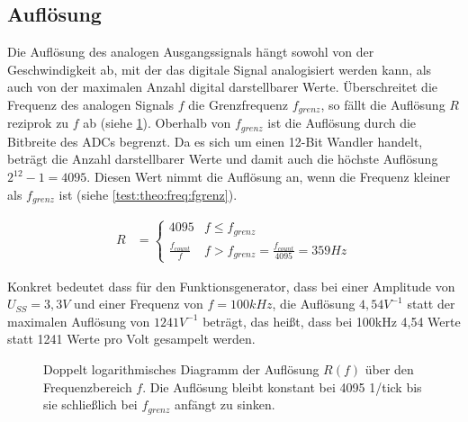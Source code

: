 \subsection{Auflösung}
Die Auflösung des analogen Ausgangssignals hängt sowohl von der Geschwindigkeit ab, mit der das digitale Signal analogisiert werden kann, als auch von der maximalen Anzahl digital darstellbarer Werte.
Überschreitet die Frequenz des analogen Signals $f$ die Grenzfrequenz $f_{grenz}$, so fällt die Auflösung $R$ reziprok zu $f$ ab (siehe \cref{test:theo:res:plot}).
Oberhalb von $f_{grenz}$ ist die Auflösung durch die Bitbreite des ADCs begrenzt.
Da es sich um einen 12-Bit Wandler handelt, beträgt die Anzahl darstellbarer Werte und damit auch die höchste Auflösung $2^{12} - 1 = 4095$.
Diesen Wert nimmt die Auflösung an, wenn die Frequenz kleiner als $f_{grenz}$ ist (siehe \cref{test:theo:freq:fgrenz}).

\begin{align}
  R &= \begin{cases}
    4095               & f \leq f_{grenz}                      \\
    \frac{f_{count}}{f} & f > f_{grenz} = \frac{f_{count}}{4095} = 359 Hz
        \end{cases} \label{test:theo:freq:fgrenz}
\end{align}

Konkret bedeutet dass für den Funktionsgenerator, dass bei einer Amplitude von $U_{SS}=3,3V$ und einer Frequenz von $f=100kHz$, die Auflösung $4,54V^{-1}$ statt der maximalen Auflösung von $1241V^{-1}$ beträgt, das heißt, dass bei 100kHz 4,54 Werte statt 1241 Werte pro Volt gesampelt werden.

\begin{figure}[h] \centering
 \caption{Doppelt logarithmisches Diagramm der Auflösung $R(f)$ über den Frequenzbereich $f$. Die Auflösung bleibt konstant bei 4095 1/tick bis sie schließlich bei $f_{grenz}$ anfängt zu sinken.} \label{test:theo:res:plot}
\end{figure}

